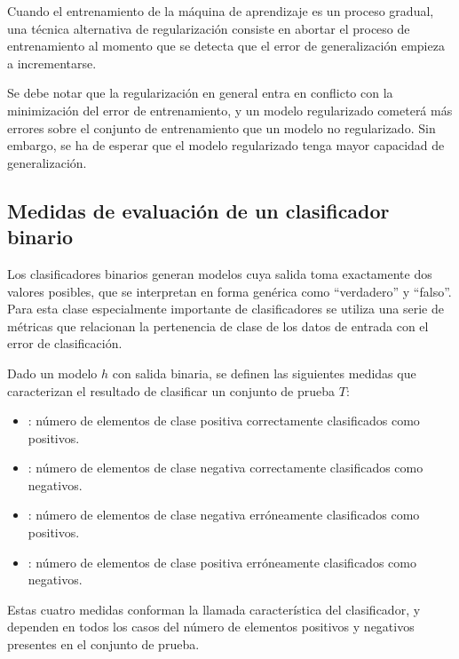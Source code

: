 Cuando el entrenamiento de la máquina de aprendizaje es un proceso
gradual, una técnica alternativa de regularización consiste en
abortar el proceso de entrenamiento al momento que se detecta
que el error de generalización empieza a incrementarse.

Se debe notar que la regularización en general entra en conflicto con
la minimización del error de entrenamiento, y un modelo regularizado
cometerá más errores sobre el conjunto de entrenamiento que un modelo
no regularizado.  Sin embargo, se ha de esperar que el modelo
regularizado tenga mayor capacidad de generalización.
%
%
\subsection{Medidas de evaluación de un clasificador binario}
%
Los clasificadores binarios generan modelos cuya salida toma
exactamente dos valores posibles, que se interpretan en forma genérica
como ``verdadero'' y ``falso''. Para esta clase especialmente
importante de clasificadores se utiliza una serie de métricas que
relacionan la pertenencia de clase de los datos de entrada con el
error de clasificación.

Dado un modelo $h$ con salida binaria, se definen las siguientes
medidas que caracterizan el resultado de clasificar un conjunto de
prueba $T$:
%
\begin{itemize}
  \iflatexml\else[style=nextline]\fi
  \item{}: número de elementos de clase
    positiva correctamente clasificados como positivos.
  \item{}: número de elementos de clase
    negativa correctamente clasificados como negativos.
  \item{}: número de elementos de clase
    negativa erróneamente clasificados como positivos.
  \item{}: número de elementos de clase
    positiva erróneamente clasificados como negativos.
\end{itemize}
%
Estas cuatro medidas conforman la llamada 
característica del clasificador, y dependen en todos los casos del
número de elementos positivos y negativos presentes en el conjunto de
prueba.
%
